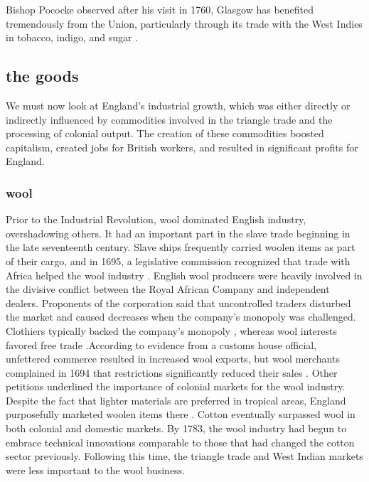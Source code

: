 Bishop Pococke observed after his visit in 1760, Glasgow has benefited tremendously from the Union, particularly through its trade with the West Indies in tobacco, indigo, and sugar .
\subsection{the goods}
We must now look at England's industrial growth, which was either directly or indirectly influenced by commodities involved in the triangle trade and the processing of colonial output. The creation of these commodities boosted capitalism, created jobs for British workers, and resulted in significant profits for England.
\subsubsection{wool}
Prior to the Industrial Revolution, wool dominated English industry, overshadowing others. It had an important part in the slave trade beginning in the late seventeenth century. Slave ships frequently carried woolen items as part of their cargo, and in 1695, a legislative commission recognized that trade with Africa helped the wool industry . English wool producers were heavily involved in the divisive conflict between the Royal African Company and independent dealers. Proponents of the corporation said that uncontrolled traders disturbed the market and caused decreases when the company's monopoly was challenged. Clothiers typically backed the company's monopoly , whereas wool interests favored free trade .According to evidence from a customs house official, unfettered commerce resulted in increased wool exports, but wool merchants complained in 1694 that restrictions significantly reduced their sales . Other petitions underlined the importance of colonial markets for the wool industry. Despite the fact that lighter materials are preferred in tropical areas, England purposefully marketed woolen items there . Cotton eventually surpassed wool in both colonial and domestic markets. By 1783, the wool industry had begun to embrace technical innovations comparable to those that had changed the cotton sector previously. Following this time, the triangle trade and West Indian markets were less important to the wool business.
